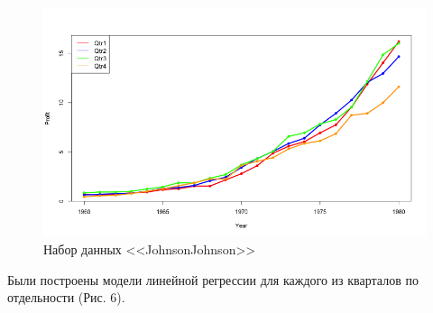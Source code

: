 \documentclass[]{article}
\numberwithin{equation}{section}
\begin{document}
    \begin{figure}[H]
        \centering
        \includegraphics[width = 0.8\linewidth]{data/JnJ_qtr.png}
        \vspace{-0.6cm}
        \caption{Набор данных <<JohnsonJohnson>>}
    \end{figure}
    \vspace{-0.6cm}
    Были построены модели линейной регрессии для каждого из кварталов по отдельности (Рис. 6).
    \vspace{-0.6cm}
\end{document}
